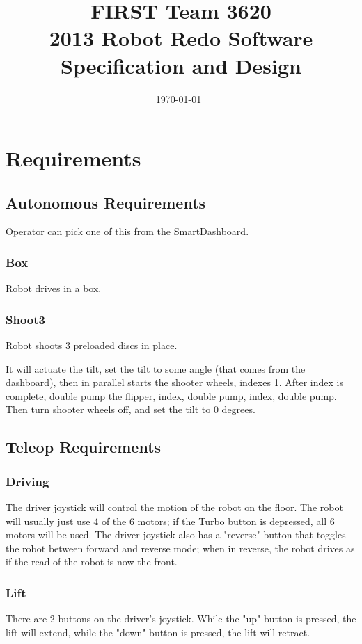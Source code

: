 \documentclass[]{article}
\title{FIRST Team 3620\\
 2013 Robot Redo Software Specification and Design}
\date{\today\ \currenttime}
\begin{document}
\maketitle

\tableofcontents
\newpage

\section{Requirements}

\subsection{Autonomous Requirements}
Operator can pick one of this from the SmartDashboard.
\subsubsection{Box}
Robot drives in a box.

\subsubsection{Shoot3}
Robot shoots 3 preloaded discs in place.

It will actuate the tilt, set the tilt to some angle (that comes from the dashboard), then in parallel starts the shooter wheels, indexes 1. After index is complete, double pump the flipper, index, double pump, index, double pump. Then turn shooter wheels off, and set the tilt to 0 degrees.

\subsection{Teleop Requirements}

\subsubsection{Driving}
The driver joystick will control the motion of the robot on the floor. The robot will usually just use 4 of the 6 motors; if the Turbo button is depressed, all 6 motors will be used. The driver joystick also has a "reverse" button that toggles the robot between forward and reverse mode; when in reverse, the robot drives as if the read of the robot is now the front.

\subsubsection{Lift}
There are 2 buttons on the driver's joystick. While the "up" button is pressed, the lift will extend, while the "down" button is pressed, the lift will retract.
\end{document}
